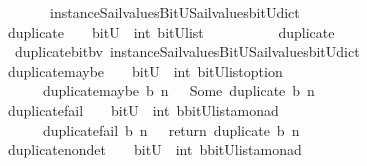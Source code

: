 \begin{isabellebody}
\ \ \ \ \ \ \ instance{\isacharunderscore}Sail{}{\isacharunderscore}values{\isacharunderscore}BitU{\isacharunderscore}Sail{}{\isacharunderscore}values{\isacharunderscore}bitU{\isacharunderscore}dict{\isacharparenright}\ {\isacharparenright}{\isachardoublequoteclose}\isanewline
\isanewline
\isanewline
%
\isanewline
{}\isamarkupfalse%
\ duplicate\ \ {\isacharcolon}{\isacharcolon}\ {\isachardoublequoteopen}\ bitU\ {\isasymRightarrow}\ int\ {\isasymRightarrow}{\isacharparenleft}bitU{\isacharparenright}list\ {\isachardoublequoteclose}\ \ \ \isanewline
\ \ \ \ \ {\isachardoublequoteopen}\ duplicate\ {\isacharequal}\ {\isacharparenleft}\ \isanewline
\ \ duplicate{\isacharunderscore}bit{\isacharunderscore}bv\ instance{\isacharunderscore}Sail{}{\isacharunderscore}values{\isacharunderscore}BitU{\isacharunderscore}Sail{}{\isacharunderscore}values{\isacharunderscore}bitU{\isacharunderscore}dict\ {\isacharparenright}{\isachardoublequoteclose}\isanewline
\isanewline
{}\isamarkupfalse%
\ duplicate{\isacharunderscore}maybe\ \ {\isacharcolon}{\isacharcolon}\ {\isachardoublequoteopen}\ bitU\ {\isasymRightarrow}\ int\ {\isasymRightarrow}{\isacharparenleft}{\isacharparenleft}bitU{\isacharparenright}list{\isacharparenright}option\ {\isachardoublequoteclose}\ \ \ \isanewline
\ \ \ \ \ {\isachardoublequoteopen}\ duplicate{\isacharunderscore}maybe\ b\ n\ {\isacharequal}\ {\isacharparenleft}\ Some\ {\isacharparenleft}duplicate\ b\ n{\isacharparenright}{\isacharparenright}{\isachardoublequoteclose}\isanewline
\isanewline
{}\isamarkupfalse%
\ duplicate{\isacharunderscore}fail\ \ {\isacharcolon}{\isacharcolon}\ {\isachardoublequoteopen}\ bitU\ {\isasymRightarrow}\ int\ {\isasymRightarrow}{\isacharparenleft}{\isacharprime}b{\isacharcomma}{\isacharparenleft}{\isacharparenleft}bitU{\isacharparenright}list{\isacharparenright}{\isacharcomma}{\isacharprime}a{\isacharparenright}monad\ {\isachardoublequoteclose}\ \ \ \isanewline
\ \ \ \ \ {\isachardoublequoteopen}\ duplicate{\isacharunderscore}fail\ b\ n\ {\isacharequal}\ {\isacharparenleft}\ return\ {\isacharparenleft}duplicate\ b\ n{\isacharparenright}{\isacharparenright}{\isachardoublequoteclose}\isanewline
\isanewline
{}\isamarkupfalse%
\ duplicate{\isacharunderscore}nondet\ \ {\isacharcolon}{\isacharcolon}\ {\isachardoublequoteopen}\ bitU\ {\isasymRightarrow}\ int\ {\isasymRightarrow}{\isacharparenleft}{\isacharprime}b{\isacharcomma}{\isacharparenleft}{\isacharparenleft}bitU{\isacharparenright}list{\isacharparenright}{\isacharcomma}{\isacharprime}a{\isacharparenright}monad\ {\isachardoublequoteclose}\ \ \ \isanewline

\end{isabellebody}
